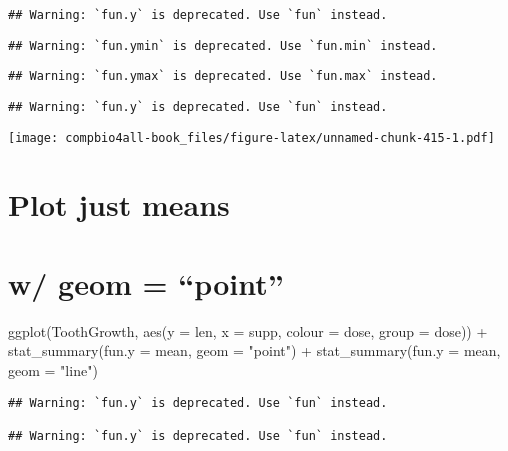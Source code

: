 \documentclass[
]{book}
\newenvironment{Shaded}{\begin{snugshade}}{\end{snugshade}}
\newcommand{\AttributeTok}[1]{\textcolor[rgb]{0.77,0.63,0.00}{#1}}
\newcommand{\FunctionTok}[1]{\textcolor[rgb]{0.00,0.00,0.00}{#1}}
\newcommand{\NormalTok}[1]{#1}
\newcommand{\SpecialCharTok}[1]{\textcolor[rgb]{0.00,0.00,0.00}{#1}}
\newcommand{\StringTok}[1]{\textcolor[rgb]{0.31,0.60,0.02}{#1}}
\begin{document}
\begin{verbatim}
## Warning: `fun.y` is deprecated. Use `fun` instead.
\end{verbatim}

\begin{verbatim}
## Warning: `fun.ymin` is deprecated. Use `fun.min` instead.
\end{verbatim}

\begin{verbatim}
## Warning: `fun.ymax` is deprecated. Use `fun.max` instead.
\end{verbatim}

\begin{verbatim}
## Warning: `fun.y` is deprecated. Use `fun` instead.
\end{verbatim}

\texttt{[image: compbio4all-book\_files/figure-latex/unnamed-chunk-415-1.pdf]}

\hypertarget{plot-just-means}{%
\section{Plot just means}\label{plot-just-means}}

\hypertarget{w-geom-point}{%
\section{w/ geom = ``point''}\label{w-geom-point}}

\begin{Shaded}
\begin{Highlighting}[]
\FunctionTok{ggplot}\NormalTok{(ToothGrowth, }\FunctionTok{aes}\NormalTok{(}\AttributeTok{y =}\NormalTok{ len, }\AttributeTok{x =}\NormalTok{ supp, }\AttributeTok{colour =}\NormalTok{ dose, }\AttributeTok{group =}\NormalTok{ dose)) }\SpecialCharTok{+} 
  \FunctionTok{stat\_summary}\NormalTok{(}\AttributeTok{fun.y =}\NormalTok{ mean,}
               \AttributeTok{geom =} \StringTok{"point"}\NormalTok{) }\SpecialCharTok{+}
  \FunctionTok{stat\_summary}\NormalTok{(}\AttributeTok{fun.y =}\NormalTok{ mean,}
               \AttributeTok{geom =} \StringTok{"line"}\NormalTok{)}
\end{Highlighting}
\end{Shaded}

\begin{verbatim}
## Warning: `fun.y` is deprecated. Use `fun` instead.

## Warning: `fun.y` is deprecated. Use `fun` instead.
\end{verbatim}
\end{document}
